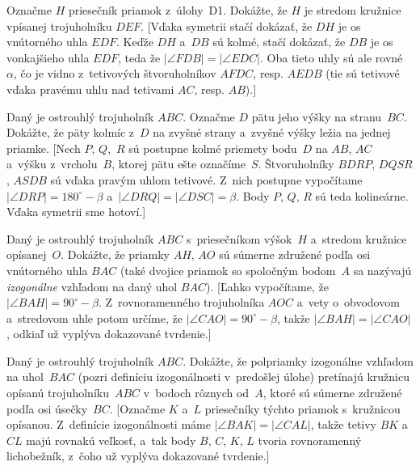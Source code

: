 {Označme $H$ priesečník priamok z~úlohy~D1. Dokážte,
že $H$ je stredom kružnice vpísanej trojuholníku $DEF$. [Vďaka
symetrii stačí dokázať, že $DH$ je os vnútorného uhla $EDF$.
Keďže $DH$ a~$DB$ sú kolmé, stačí dokázať, že $DB$ je os
vonkajšieho uhla $EDF$, teda že $|\angle FDB| = |\angle EDC|$. Oba
tieto uhly sú ale rovné~$\alpha$, čo je vidno z~tetivových
štvoruholníkov $AFDC$, resp. $AEDB$ (tie sú tetivové vďaka
pravému uhlu nad tetivami $AC$, resp. $AB$).]

Daný je ostrouhlý trojuholník $ABC$. Označme $D$ pätu jeho
výšky na stranu~$BC$. Dokážte, že päty kolmíc z~$D$ na zvyšné
strany a~zvyšné výšky ležia na jednej priamke.
[Nech $P$, $Q$,~$R$ sú
postupne kolmé priemety bodu~$D$ na $AB$, $AC$ a~výšku z~vrcholu~$B$,
ktorej pätu ešte označíme~$S$. Štvoruholníky
$BDRP$, $DQSR$, $ASDB$ sú vďaka pravým uhlom tetivové. Z~nich
postupne vypočítame $|\angle DRP| = 180^\circ- \beta$ a~$|\angle
DRQ| = |\angle DSC| = \beta$. Body $P$, $Q$, $R$ sú teda kolineárne.
Vďaka symetrii sme hotoví.]

Daný je ostrouhlý trojuholník $ABC$ s~priesečníkom výšok~$H$
a~stredom kružnice opísanej~$O$. Dokážte, že priamky $AH$, $AO$ sú
súmerne združené podľa osi vnútorného uhla $BAC$ (také dvojice
priamok so spoločným bodom~$A$ sa nazývajú {\it izogonálne\/} vzhľadom na daný uhol $BAC$).
[Ľahko vypočítame, že $|\angle BAH| = 90^\circ- \beta$. Z~rovnoramenného
trojuholníka $AOC$ a~vety o~obvodovom a~stredovom uhle potom určíme, že
$|\angle CAO| = 90^\circ- \beta$, takže $|\angle BAH| = |\angle CAO|$,
odkiaľ už vyplýva dokazované tvrdenie.]

Daný je ostrouhlý trojuholník $ABC$. Dokážte, že
polpriamky izogonálne vzhľadom na uhol~$BAC$ (pozri definíciu izogonálnosti
v~predošlej úlohe) pretínajú kružnicu opísanú trojuholníku~$ABC$ v~bodoch
rôznych od~$A$, ktoré sú súmerne združené podľa osi úsečky~$BC$.
[Označme $K$ a~$L$ priesečníky týchto priamok s~kružnicou
opísanou. Z~definície izogonálnosti máme $|\angle BAK| = |\angle CAL|$,
takže tetivy $BK$ a~$CL$ majú rovnakú veľkosť, a~tak body $B$, $C$, $K$, $L$
tvoria rovnoramenný lichobežník, z~čoho už vyplýva dokazované tvrdenie.]
}


